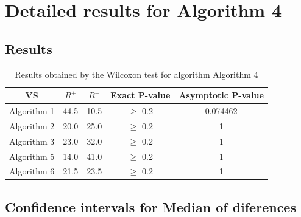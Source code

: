\documentclass[a4paper,10pt]{article}
\begin{document}
 \clearpage 


\section{Detailed results for Algorithm 4}


\subsection{Results}

\begin{table}[!htp]
\centering\small
\begin{tabular}{
|c|c|c|c|c|}
\hline
 VS & $R^{+}$ & $R^{-}$ & Exact P-value & Asymptotic P-value \\ \hline 
Algorithm 1 & 44.5 & 10.5 & $\geq$ 0.2 & 0.074462\\ \hline 
Algorithm 2 & 20.0 & 25.0 & $\geq$ 0.2 & 1\\ \hline 
Algorithm 3 & 23.0 & 32.0 & $\geq$ 0.2 & 1\\ \hline 
Algorithm 5 & 14.0 & 41.0 & $\geq$ 0.2 & 1\\ \hline 
Algorithm 6 & 21.5 & 23.5 & $\geq$ 0.2 & 1\\ \hline 

\end{tabular}
\caption{Results obtained by the Wilcoxon test for algorithm Algorithm 4}
\end{table}

\subsection{Confidence intervals for Median of diferences}
\end{document}
